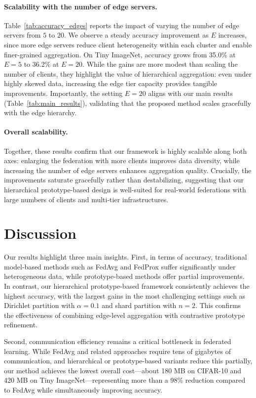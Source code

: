 \documentclass[twoside]{article}
\begin{document}
\paragraph{Scalability with the number of edge servers.} 
Table~\ref{tab:accuracy_edges} reports the impact of varying the number of edge servers from $5$ to $20$. 
We observe a steady accuracy improvement as $E$ increases, since more edge servers reduce client heterogeneity within each cluster and enable finer-grained aggregation. 
On Tiny ImageNet, accuracy grows from 35.0\% at $E=5$ to 36.2\% at $E=20$. 
While the gains are more modest than scaling the number of clients, they highlight the value of hierarchical aggregation: even under highly skewed data, increasing the edge tier capacity provides tangible improvements. 
Importantly, the setting $E=20$ aligns with our main results (Table~\ref{tab:main_results}), validating that the proposed method scales gracefully with the edge hierarchy. 

\paragraph{Overall scalability.} 
Together, these results confirm that our framework is highly scalable along both axes: enlarging the federation with more clients improves data diversity, while increasing the number of edge servers enhances aggregation quality. 
Crucially, the improvements saturate gracefully rather than destabilizing, suggesting that our hierarchical prototype-based design is well-suited for real-world federations with large numbers of clients and multi-tier infrastructures. 


\section{Discussion}

Our results highlight three main insights. First, in terms of accuracy, traditional model-based methods such as FedAvg and FedProx suffer significantly under heterogeneous data, while prototype-based methods offer partial improvements. In contrast, our hierarchical prototype-based framework consistently achieves the highest accuracy, with the largest gains in the most challenging settings such as Dirichlet partition with $\alpha=0.1$ and shard partition with $n=2$. This confirms the effectiveness of combining edge-level aggregation with contrastive prototype refinement.  

Second, communication efficiency remains a critical bottleneck in federated learning. While FedAvg and related approaches require tens of gigabytes of communication, and hierarchical or prototype-based variants reduce this partially, our method achieves the lowest overall cost—about 180 MB on CIFAR-10 and 420 MB on Tiny ImageNet—representing more than a 98\% reduction compared to FedAvg while simultaneously improving accuracy.  
\end{document}
